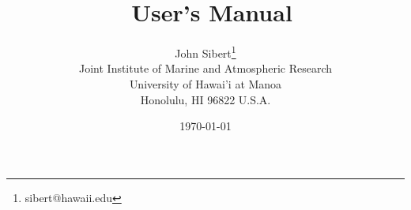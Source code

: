 \documentclass[12pt,letterpaper]{report}
\author{
John Sibert\thanks{sibert@hawaii.edu}\\
Joint Institute of Marine and Atmospheric Research\\
University of Hawai'i at Manoa\\
Honolulu, HI  96822 U.S.A.\\[0.125in]
\date{\today}
}
\title{\TT\ User's Manual}
\newcommand\doublespacing{\baselineskip=1.6\normalbaselineskip}
\newcommand\help[1]{\color{red}{\it #1 }\normalcolor}
\begin{document}
\begin{titlepage}
\maketitle
\end{titlepage}

\clearpage\thispagestyle{empty}
\clearpage\pagestyle{myheadings}
\setcounter{page}{1}


\end{document}
